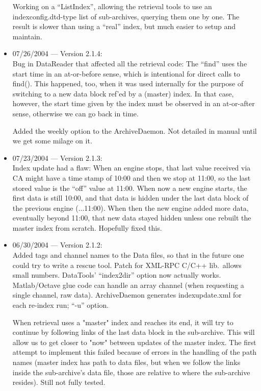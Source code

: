 \begin{itemize}
Working on a ``ListIndex'', allowing the retrieval
tools to use an indexconfig.dtd-type list of
sub-archives, querying them one by one.
The result is slower than using a ``real'' index,
but much easier to setup and maintain.

\item 07/26/2004 --- Version 2.1.4:\\
Bug in DataReader that affected all the retrieval code:
The ``find'' uses the start time in an at-or-before sense,
which is intentional for direct calls to find().
This happened, too, when it was used internally for the purpose
of switching to a new data block ref'ed by a (master) index.
In that case, however, the start time given by the index must
be observed in an at-or-after sense, otherwise we can go
back in time.

Added the weekly option to the ArchiveDaemon.
Not detailed in manual until we get some milage on it.

\item 07/23/2004 --- Version 2.1.3:\\
Index update had a flaw:
When an engine stops, that last value received via CA
might have a time stamp of 10:00 and then we stop
at 11:00, so the last stored value is the ``off'' value
at 11:00.
When now a new engine starts, the first data is still
10:00, and that data is hidden under the last data block
of the previous engine (...11:00).
When then the new engine added more data, eventually
beyond 11:00, that new data stayed hidden unless
one rebuilt the master index from scratch.
Hopefully fixed this.

\item 06/30/2004 --- Version 2.1.2:\\
Added tags and channel names to the Data files,
so that in the future one could try to write
a rescue tool.
Patch for XML-RPC C/C++ lib.\ allows small numbers.
DataTools' ``index2dir'' option now actually works.
Matlab/Octave glue code can handle an array channel
(when requesting a single channel, raw data).
ArchiveDaemon generates indexupdate.xml for each re-index run;
``-u'' option.

When retrieval uses a "master" index and reaches
its end, it will try to continue by following
links of the last data block in the sub-archive.
This will allow us to get closer to "now" between
updates of the master index.
The first attempt to implement this failed because
of errors in the handling of the path names
(master index has path to data files, but when
we follow the links inside the sub-archive's data
file, those are relative to where the sub-archive resides).
Still not fully tested.


\end{itemize}

